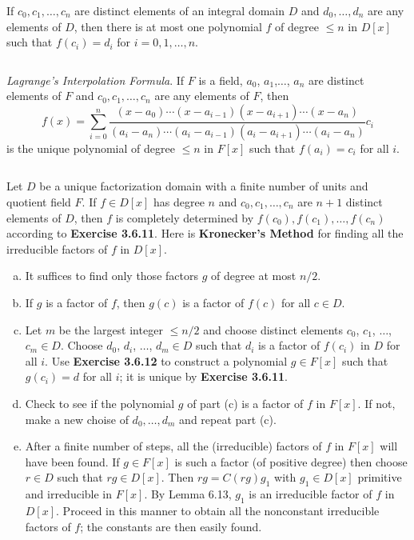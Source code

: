 $$ $$

\begin{ex}
    If $c_{0}, c_{1},\dots, c_{n}$ are distinct elements of an integral domain $D$ and $d_{0},\dots,d_{n}$ are any elements of $D$, then there is at most one polynomial $f$ of degree $\leq n$ in $D[x]$ such that $f(c_{i})=d_{i}$ for $i=0,1,\dots,n$.
\end{ex}

$$ $$

\begin{ex}
    \emph{Lagrange's Interpolation Formula}. If $F$ is a field, $a_{0}$, $a_{1}$,$\dots$, $a_{n}$ are distinct elements of $F$ and $c_{0}, c_{1},\dots,c_{n}$ are any elements of $F$, then \[f(x)=\sum_{i=0}^{n}\frac{(x-a_{0})\cdots(x-a_{i-1})(x-a_{i+1})\cdots(x-a_{n})}{(a_{i}-a_{n})\cdots(a_{i}-a_{i-1})(a_{i}-a_{i+1})\cdots(a_{i}-a_{n})}c_{i}\] is the unique polynomial of degree $\leq n$ in $F[x]$ such that $f(a_{i})=c_{i}$ for all $i$.
\end{ex}

$$ $$

\begin{ex}
    Let $D$ be a unique factorization domain with a finite number of units and quotient field $F$. If $f\in D[x]$ has degree $n$ and $c_{0},c_{1},\dots,c_{n}$ are $n+1$ distinct elements of $D$, then $f$ is completely determined by $f(c_{0}), f(c_{1}),\dots, f(c_{n})$ according to \textbf{Exercise 3.6.11}. Here is \textbf{Kronecker's Method} for finding all the irreducible factors of $f$ in $D[x]$.
    \begin{enumerate}[(a)]
        \item It suffices to find only those factors $g$ of degree at most $n /2$.
        \item If $g$ is a factor of $f$, then $g(c)$ is a factor of $f(c)$ for all $c\in D$.
        \item Let $m$ be the largest integer $\leq n /2$ and choose distinct elements $c_{0}$, $c_{1}$, $\dots$, $c_{m}\in D$. Choose $d_{0}$, $d_{i}$, $\dots$, $d_{m}\in D$ such that $d_{i}$ is a factor of $f(c_{i})$ in $D$ for all $i$. Use \textbf{Exercise 3.6.12} to construct a polynomial $g\in F[x]$ such that $g(c_{i})=d$ for all $i$; it is unique by \textbf{Exercise 3.6.11}.
        \item Check to see if the polynomial $g$ of part (c) is a factor of $f$ in $F[x]$. If not, make a new choise of $d_{0}, \dots, d_{m}$ and repeat part (c).
        \item After a finite number of steps, all the (irreducible) factors of $f$ in $F[x]$ will have been found. If $g\in F[x]$ is such a factor (of positive degree) then choose $r\in D$ such that $rg\in D[x]$. Then $rg=C(rg)g_{1}$ with $g_{1}\in D[x]$ primitive and irreducible in $F[x]$. By Lemma 6.13, $g_{1}$ is an irreducible factor of $f$ in $D[x]$. Proceed in this manner to obtain all the nonconstant irreducible factors of $f$; the constants are then easily found.
    \end{enumerate}
\end{ex}

